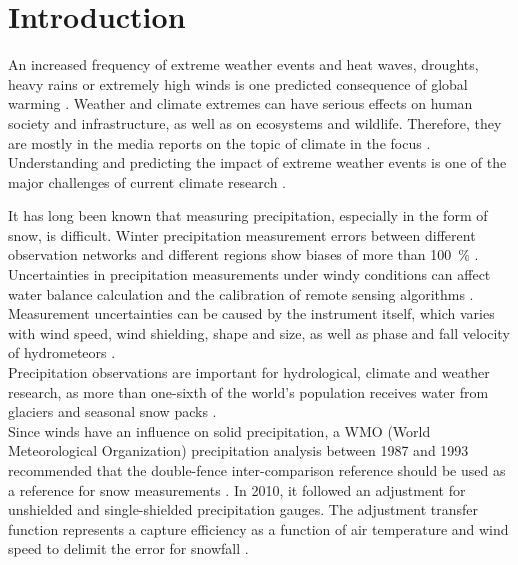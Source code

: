 \chapter{Introduction}
\label{ch:intro}
An increased frequency of extreme weather events and heat waves, droughts, heavy rains or extremely high winds is one predicted consequence of global warming \citep{hansen_warmer_2014}. Weather and climate extremes can have serious effects on human society and infrastructure, as well as on ecosystems and wildlife. Therefore, they are mostly in the media reports on the topic of climate in the focus \citep{meehl_introduction_2000}. Understanding and predicting the impact of extreme weather events is one of the major challenges of current climate research \citep{stocker_working_2013,field_summary_2014}.
\par\medskip
\noindent
It has long been known that measuring precipitation, especially in the form of snow, is difficult. Winter precipitation measurement errors between different observation networks and different regions show biases of more than \SI{100}{\percent} \citep{kochendorfer_analysis_2017}. Uncertainties in precipitation measurements under windy conditions can affect water balance calculation and the calibration of remote sensing algorithms \citep{wolff_derivation_2015}. Measurement uncertainties can be caused by the instrument itself, which varies with wind speed, wind shielding, shape and size, as well as phase and fall velocity of hydrometeors \citep{kochendorfer_analysis_2017,wolff_derivation_2015}. 
\\
Precipitation observations are important for hydrological, climate and weather research, as more than one-sixth of the world's population receives water from glaciers and seasonal snow packs \citep{barnett_potential_2005}.
\\
Since winds have an influence on solid precipitation, a WMO (World Meteorological Organization) precipitation analysis between 1987 and 1993 recommended that the double-fence inter-comparison reference should be used as a reference for snow measurements \citep{goodison_wmo_1998}. In 2010, it followed an adjustment for unshielded and single-shielded precipitation gauges. The adjustment transfer function represents a capture efficiency as a function of air temperature and wind speed to delimit the error for snowfall \citep{kochendorfer_analysis_2017,wolff_derivation_2015}.
